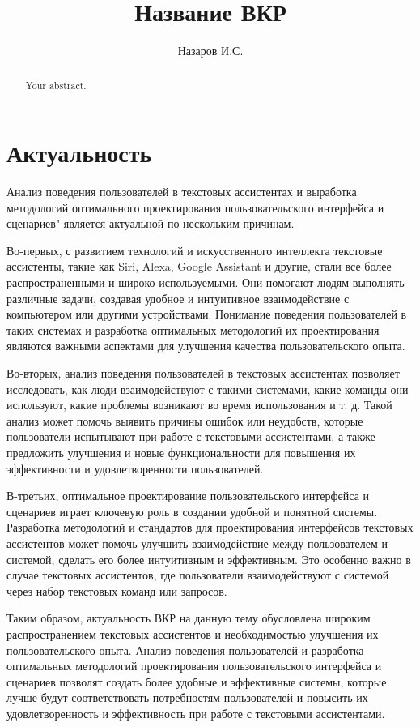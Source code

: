 \documentclass{article}
\title{Название ВКР}
\author{Назаров И.С.}
\begin{document}
\maketitle

\begin{abstract}
Your abstract.
\end{abstract}


\section{Актуальность}
Анализ поведения пользователей в текстовых ассистентах и выработка методологий оптимального проектирования пользовательского интерфейса и сценариев" является актуальной по нескольким причинам.

Во-первых, с развитием технологий и искусственного интеллекта текстовые ассистенты, такие как Siri, Alexa, Google Assistant и другие, стали все более распространенными и широко используемыми. Они помогают людям выполнять различные задачи, создавая удобное и интуитивное взаимодействие с компьютером или другими устройствами. Понимание поведения пользователей в таких системах и разработка оптимальных методологий их проектирования являются важными аспектами для улучшения качества пользовательского опыта.

Во-вторых, анализ поведения пользователей в текстовых ассистентах позволяет исследовать, как люди взаимодействуют с такими системами, какие команды они используют, какие проблемы возникают во время использования и т. д. Такой анализ может помочь выявить причины ошибок или неудобств, которые пользователи испытывают при работе с текстовыми ассистентами, а также предложить улучшения и новые функциональности для повышения их эффективности и удовлетворенности пользователей.

В-третьих, оптимальное проектирование пользовательского интерфейса и сценариев играет ключевую роль в создании удобной и понятной системы. Разработка методологий и стандартов для проектирования интерфейсов текстовых ассистентов может помочь улучшить взаимодействие между пользователем и системой, сделать его более интуитивным и эффективным. Это особенно важно в случае текстовых ассистентов, где пользователи взаимодействуют с системой через набор текстовых команд или запросов.

Таким образом, актуальность ВКР на данную тему обусловлена широким распространением текстовых ассистентов и необходимостью улучшения их пользовательского опыта. Анализ поведения пользователей и разработка оптимальных методологий проектирования пользовательского интерфейса и сценариев позволят создать более удобные и эффективные системы, которые лучше будут соответствовать потребностям пользователей и повысить их удовлетворенность и эффективность при работе с текстовыми ассистентами.
\end{document}
